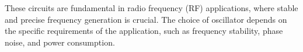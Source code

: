 These circuits are fundamental in radio frequency (RF) applications, where stable and precise frequency generation is crucial. The choice of oscillator depends on the specific requirements of the application, such as frequency stability, phase noise, and power consumption.

